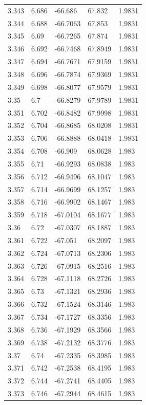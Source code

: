 \begin{tabular}{lllll}
3.343 & 6.686 & -66.686 & 67.832 & 1.9831 \\
3.344 & 6.688 & -66.7063 & 67.853 & 1.9831 \\
3.345 & 6.69 & -66.7265 & 67.874 & 1.9831 \\
3.346 & 6.692 & -66.7468 & 67.8949 & 1.9831 \\
3.347 & 6.694 & -66.7671 & 67.9159 & 1.9831 \\
3.348 & 6.696 & -66.7874 & 67.9369 & 1.9831 \\
3.349 & 6.698 & -66.8077 & 67.9579 & 1.9831 \\
3.35 & 6.7 & -66.8279 & 67.9789 & 1.9831 \\
3.351 & 6.702 & -66.8482 & 67.9998 & 1.9831 \\
3.352 & 6.704 & -66.8685 & 68.0208 & 1.9831 \\
3.353 & 6.706 & -66.8888 & 68.0418 & 1.9831 \\
3.354 & 6.708 & -66.909 & 68.0628 & 1.983 \\
3.355 & 6.71 & -66.9293 & 68.0838 & 1.983 \\
3.356 & 6.712 & -66.9496 & 68.1047 & 1.983 \\
3.357 & 6.714 & -66.9699 & 68.1257 & 1.983 \\
3.358 & 6.716 & -66.9902 & 68.1467 & 1.983 \\
3.359 & 6.718 & -67.0104 & 68.1677 & 1.983 \\
3.36 & 6.72 & -67.0307 & 68.1887 & 1.983 \\
3.361 & 6.722 & -67.051 & 68.2097 & 1.983 \\
3.362 & 6.724 & -67.0713 & 68.2306 & 1.983 \\
3.363 & 6.726 & -67.0915 & 68.2516 & 1.983 \\
3.364 & 6.728 & -67.1118 & 68.2726 & 1.983 \\
3.365 & 6.73 & -67.1321 & 68.2936 & 1.983 \\
3.366 & 6.732 & -67.1524 & 68.3146 & 1.983 \\
3.367 & 6.734 & -67.1727 & 68.3356 & 1.983 \\
3.368 & 6.736 & -67.1929 & 68.3566 & 1.983 \\
3.369 & 6.738 & -67.2132 & 68.3776 & 1.983 \\
3.37 & 6.74 & -67.2335 & 68.3985 & 1.983 \\
3.371 & 6.742 & -67.2538 & 68.4195 & 1.983 \\
3.372 & 6.744 & -67.2741 & 68.4405 & 1.983 \\
3.373 & 6.746 & -67.2944 & 68.4615 & 1.983 \\

\end{tabular}
